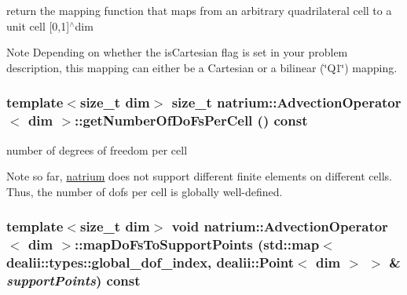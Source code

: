 return the mapping function that maps from an arbitrary quadrilateral cell to a unit cell \mbox{[}0,1\mbox{]}$^\wedge$dim \begin{DoxyNote}{Note}
Depending on whether the isCartesian flag is set in your problem description, this mapping can either be a Cartesian or a bilinear (\char`\"{}Q1\char`\"{}) mapping. 
\end{DoxyNote}
\hypertarget{classnatrium_1_1AdvectionOperator_abd4d7735336cda33f9c117ffcee0db0b}{
\subsubsection[{getNumberOfDoFsPerCell}]{\setlength{\rightskip}{0pt plus 5cm}template$<$size\_\-t dim$>$ size\_\-t {\bf natrium::AdvectionOperator}$<$ dim $>$::getNumberOfDoFsPerCell () const}}
\label{classnatrium_1_1AdvectionOperator_abd4d7735336cda33f9c117ffcee0db0b}


number of degrees of freedom per cell \begin{DoxyNote}{Note}
so far, \hyperlink{namespacenatrium}{natrium} does not support different finite elements on different cells. Thus, the number of dofs per cell is globally well-\/defined. 
\end{DoxyNote}
\hypertarget{classnatrium_1_1AdvectionOperator_a3de39c26aa52db4ced3d2d78e192ebce}{
\subsubsection[{mapDoFsToSupportPoints}]{\setlength{\rightskip}{0pt plus 5cm}template$<$size\_\-t dim$>$ void {\bf natrium::AdvectionOperator}$<$ dim $>$::mapDoFsToSupportPoints (std::map$<$ dealii::types::global\_\-dof\_\-index, dealii::Point$<$ dim $>$ $>$ \& {\em supportPoints}) const}}
\label{classnatrium_1_1AdvectionOperator_a3de39c26aa52db4ced3d2d78e192ebce}


